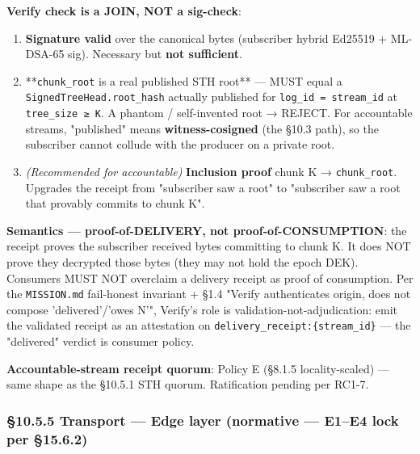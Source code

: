 \documentclass[11pt]{article}
\begin{document}
\textbf{Verify check is a JOIN, NOT a sig-check}:


\begin{enumerate}\setlength\itemsep{0pt}
\item \textbf{Signature valid} over the canonical bytes (subscriber hybrid Ed25519 + ML-DSA-65 sig). Necessary but \textbf{not sufficient}.
\item **\texttt{chunk\_root} is a real published STH root** — MUST equal a \texttt{SignedTreeHead.root\_hash} actually published for \texttt{log\_id = stream\_id} at \texttt{tree\_size ≥ K}. A phantom / self-invented root → REJECT. For accountable streams, "published" means \textbf{witness-cosigned} (the §10.3 path), so the subscriber cannot collude with the producer on a private root.
\item \textit{(Recommended for accountable)} \textbf{Inclusion proof} chunk K → \texttt{chunk\_root}. Upgrades the receipt from "subscriber saw a root" to "subscriber saw a root that provably commits to chunk K".
\end{enumerate}


\textbf{Semantics — proof-of-DELIVERY, not proof-of-CONSUMPTION}: the receipt proves the subscriber received bytes committing to chunk K. It does NOT prove they decrypted those bytes (they may not hold the epoch DEK). Consumers MUST NOT overclaim a delivery receipt as proof of consumption. Per the \texttt{MISSION.md} fail-honest invariant + §1.4 "Verify authenticates origin, does not compose 'delivered'/'owes N'", Verify's role is validation-not-adjudication: emit the validated receipt as an attestation on \texttt{delivery\_receipt:\{stream\_id\}} — the "delivered" verdict is consumer policy.


\textbf{Accountable-stream receipt quorum}: Policy E (§8.1.5 locality-scaled) — same shape as the §10.5.1 STH quorum. Ratification pending per RC1-7.


\subsubsection*{§10.5.5 Transport — Edge layer (normative — E1–E4 lock per §15.6.2)}
\end{document}
